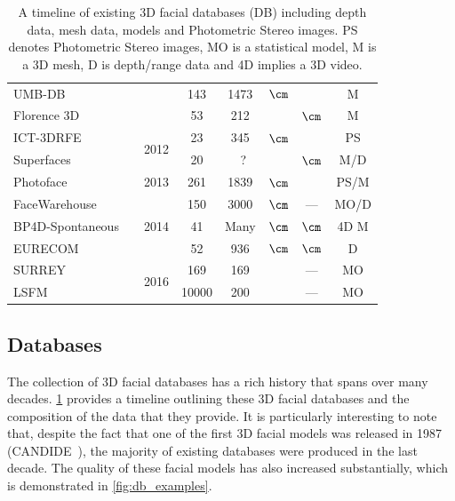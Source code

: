 \begin{table}
{\begin{tabular}{@{}lrcccccc@{}}
UMB-DB                      &\cite{colombo2011umb}          &                       & 143         & 1473        & $\cm$       &       & M      \\
Florence 3D                 &\cite{bagdanov2011florence}    &                       & 53          & 212         &             & $\cm$ & M      \\ \midrule
ICT-3DRFE                   &\cite{stratou2012exploring}    & \multirow{2}{*}{2012} & 23          & 345         & $\cm$       &       & PS     \\
Superfaces                  &\cite{berretti2012superfaces}  &                       & 20          &~?           &             & $\cm$ & M/D    \\ \midrule
Photoface                   &\cite{zafeiriou2013photoface}  & 2013                  & 261         & 1839        & $\cm$       &       & PS/M   \\ \midrule
FaceWarehouse               &\cite{Cao:2014gy}              & \multirow{3}{*}{2014} & 150         & 3000        & $\cm$       & ---   & MO/D   \\
BP4D-Spontaneous            &\cite{Zhang:2014id}            &                       & 41          & Many        & $\cm$       & $\cm$ & 4D M   \\
EURECOM                     &\cite{min2014kinectfacedb}     &                       & 52          & 936         & $\cm$       & $\cm$ & D      \\ \midrule
SURREY                      &\cite{Huber:F5Dca9zy}          & \multirow{2}{*}{2016} & 169         & 169         &             & ---   & MO     \\ 
LSFM                        &\cite{booth2016lsfm}           &                       & 10000       & 200         &             & ---   & MO     \\ \bottomrule
\end{tabular}%
}
\caption{A timeline of existing 3D facial databases (DB) including depth data, mesh
         data, models and Photometric Stereo images. PS denotes Photometric
         Stereo images, MO is a statistical model, M is a 3D mesh,
         D is depth/range data and 4D implies a 3D video.}
\label{tbl:timeline_db}
\end{table}
\subsection{Databases}\label{subsec:bg_databases}
The collection of 3D facial databases has a rich history
that spans over many decades. \cref{tbl:timeline_db} provides a
timeline outlining these 3D facial databases and the composition of the
data that they provide.
It is particularly interesting to note that, despite the fact that one of the
first 3D facial models was released in 1987 (CANDIDE~\cite{Rydfalk:1987tg}), the
majority of existing databases were produced in the last decade. The quality
of these facial models has also increased substantially, which is demonstrated
in \cref{fig:db_examples}.

